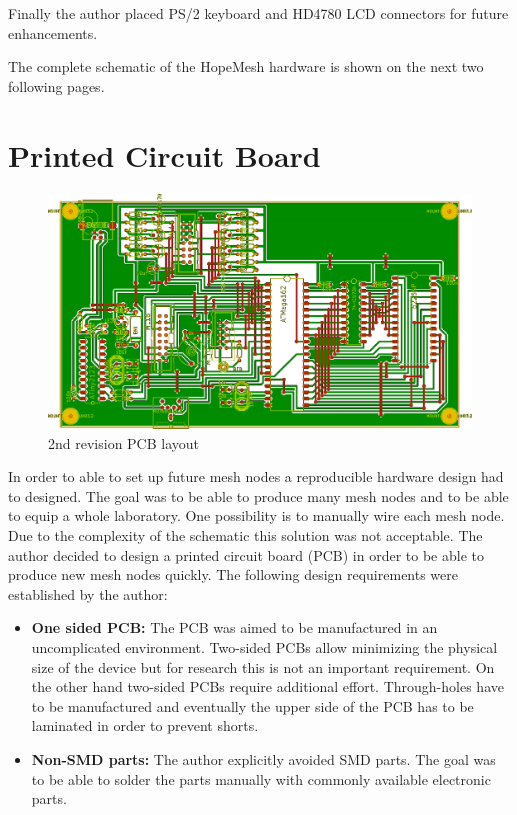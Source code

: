 Finally the author placed PS/2 keyboard and HD4780 LCD connectors for future enhancements.

The complete schematic of the HopeMesh hardware is shown on the next two following pages.





\section{Printed Circuit Board}%
\begin{figure}[H]
\includegraphics[width=\textwidth]{figures/2nd_rev_pcb_layout.png}
\caption{2nd revision PCB layout}
\end{figure}

In order to able to set up future mesh nodes a reproducible hardware design had to designed. The goal was to be able to produce many mesh nodes and to be able to equip a whole laboratory. One possibility is to manually wire each mesh node. Due to the complexity of the schematic this solution was not acceptable. The author decided to design a printed circuit board (PCB) in order to be able to produce new mesh nodes quickly. The following design requirements were established by the author:

\begin{itemize}
    \item \textbf{One sided PCB: } The PCB was aimed to be manufactured in an uncomplicated environment. Two-sided PCBs allow minimizing the physical size of the device but for research this is not an important requirement. On the other hand two-sided PCBs require additional effort. Through-holes have to be manufactured and eventually the upper side of the PCB has to be laminated in order to prevent shorts.
    \item \textbf{Non-SMD parts: } The author explicitly avoided SMD parts. The goal was to be able to solder the parts manually with commonly available electronic parts.
\end{itemize}

